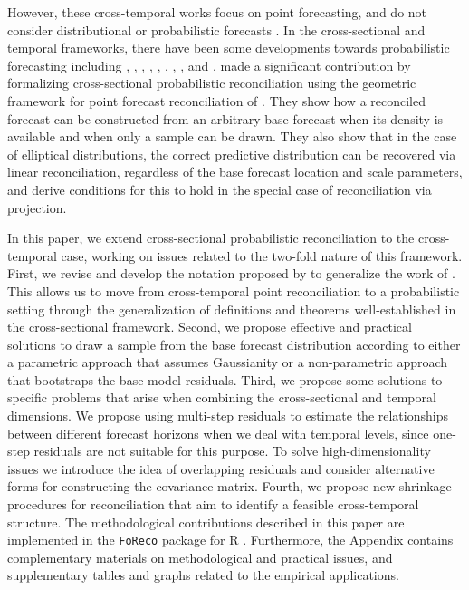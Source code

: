 \documentclass[a4paper,11pt]{article}
\theoremstyle{definition}
\begin{document}
However, these cross-temporal works focus on point forecasting, and do not consider distributional or probabilistic forecasts \citep{gneiting2014}. In the cross-sectional and temporal frameworks, there have been some developments towards probabilistic forecasting including  \cite{bentaieb2017}, \cite{panamtash2018}, \cite{jeon2019}, \cite{yang2020}, \cite{yagli2020}, 
\cite{bentaieb2021}, \cite{corani2021}, \cite{corani2022}, \cite{zambon2022} and \cite{wickramasuriya2021b}. \cite{panagiotelis2023} made a significant contribution by formalizing cross-sectional probabilistic reconciliation using the geometric framework for point forecast reconciliation of \cite{panagiotelis2021}. They show how a reconciled forecast can be constructed from an arbitrary base forecast when its density is available and when only a sample can be drawn. They also show that in the case of elliptical distributions, the correct predictive distribution can be recovered via linear reconciliation, regardless of the base forecast location and scale parameters, and derive conditions for this to hold in the special case of reconciliation via projection. 

In this paper, we extend cross-sectional probabilistic reconciliation to the cross-temporal case, working on issues related to the two-fold nature of this framework. First, we revise and develop the notation proposed by \cite{difonzo2023} to generalize the work of \cite{panagiotelis2023}. This allows us to move from cross-temporal point reconciliation to a probabilistic setting through the generalization of definitions and theorems well-established in the cross-sectional framework. Second, we propose effective and practical solutions to draw a sample from the base forecast distribution according to either a parametric approach that assumes Gaussianity or a non-parametric approach that bootstraps the base model residuals. 
Third, we propose some solutions to specific problems that arise when combining the cross-sectional and temporal dimensions. We propose using multi-step residuals to estimate the relationships between different forecast horizons when we deal with temporal levels, since one-step residuals are not suitable for this purpose. To solve high-dimensionality issues we introduce the idea of overlapping residuals and consider alternative forms for constructing the covariance matrix. Fourth, we propose new shrinkage procedures for reconciliation that aim to identify a feasible cross-temporal structure. The methodological contributions described in this paper 
are implemented in the \texttt{FoReco} package \citep{foreco2023} for R \citep{rcoreteam2022}. Furthermore, the Appendix contains complementary materials on methodological and practical issues, and supplementary tables and graphs related to the empirical applications.
\end{document}
